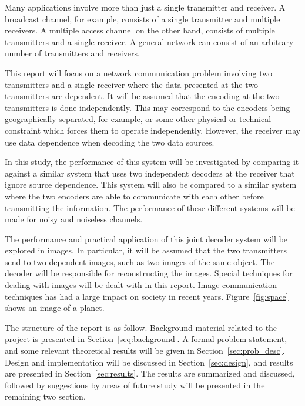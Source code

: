 \documentclass[10pt]{article}
\begin{document}
Many applications involve more than just a single transmitter and receiver. A broadcast channel, for example, consists of a single transmitter and multiple receivers. A multiple access channel on the other hand, consists of multiple transmitters and a single receiver. A general network can consist of an arbitrary number of transmitters and receivers.

This report will focus on a network communication problem involving two transmitters and a single receiver where the data presented at the two transmitters are dependent. It will be assumed that the encoding at the two transmitters is done independently. This may correspond to the encoders being geographically separated, for example, or some other physical or technical constraint which forces them to operate independently. However, the receiver may use data dependence when decoding the two data sources.

In this study, the performance of this system will be investigated by comparing it against a similar system that uses two independent decoders at the receiver that ignore source dependence. This system will also be compared to a similar system where the two encoders are able to communicate with each other before transmitting the information. The performance of these different systems will be made for noisy and noiseless channels. 

The performance and practical application of this joint decoder system will be explored in images. In particular, it will be assumed that the two transmitters send to two dependent images, such as two images of the same object. The decoder will be responsible for reconstructing the images. Special techniques for dealing with images will be dealt with in this report. Image communication techniques has had a large impact on society in recent years. Figure~\ref{fig:space} shows an image of a planet.

The structure of the report is as follow. Background material related to the project is presented in Section~\ref{seq:background}. A formal problem statement, and some relevant theoretical results will be given in Section~\ref{sec:prob_desc}. Design and implementation will be discussed in Section~\ref{sec:design}, and results are presented in Section~\ref{sec:results}. The results are summarized and discussed, followed by suggestions by areas of future study will be presented in the remaining two section.
\end{document}
